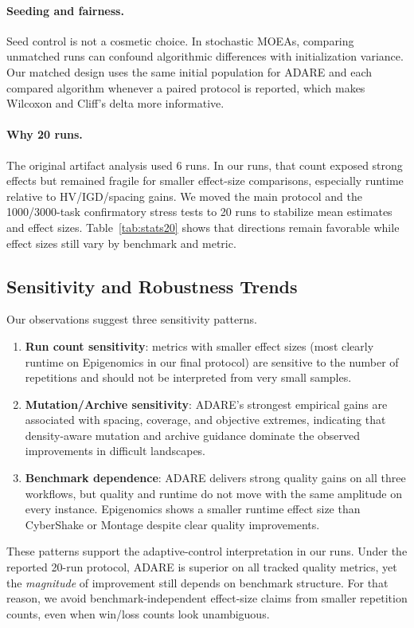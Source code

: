 \documentclass[preprint,12pt]{elsarticle}
\begin{document}
\paragraph{Seeding and fairness.}
Seed control is not a cosmetic choice. In stochastic MOEAs, comparing unmatched runs can confound algorithmic differences with initialization variance. Our matched design uses the same initial population for ADARE and each compared algorithm whenever a paired protocol is reported, which makes Wilcoxon and Cliff's delta more informative.

\paragraph{Why 20 runs.}
The original artifact analysis used 6 runs. In our runs, that count exposed strong effects but remained fragile for smaller effect-size comparisons, especially runtime relative to HV/IGD/spacing gains. We moved the main protocol and the 1000/3000-task confirmatory stress tests to 20 runs to stabilize mean estimates and effect sizes. Table~\ref{tab:stats20} shows that directions remain favorable while effect sizes still vary by benchmark and metric.

\subsection{Sensitivity and Robustness Trends}
Our observations suggest three sensitivity patterns.
\begin{enumerate}
    \item \textbf{Run count sensitivity}: metrics with smaller effect sizes (most clearly runtime on Epigenomics in our final protocol) are sensitive to the number of repetitions and should not be interpreted from very small samples.
    \item \textbf{Mutation/Archive sensitivity}: ADARE's strongest empirical gains are associated with spacing, coverage, and objective extremes, indicating that density-aware mutation and archive guidance dominate the observed improvements in difficult landscapes.
    \item \textbf{Benchmark dependence}: ADARE delivers strong quality gains on all three workflows, but quality and runtime do not move with the same amplitude on every instance. Epigenomics shows a smaller runtime effect size than CyberShake or Montage despite clear quality improvements.
\end{enumerate}

These patterns support the adaptive-control interpretation in our runs. Under the reported 20-run protocol, ADARE is superior on all tracked quality metrics, yet the \emph{magnitude} of improvement still depends on benchmark structure. For that reason, we avoid benchmark-independent effect-size claims from smaller repetition counts, even when win/loss counts look unambiguous.
\end{document}
